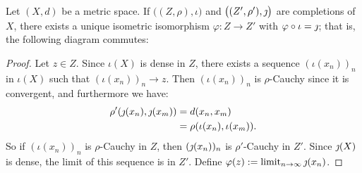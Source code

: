     \begin{theorem}\label{thm:unique-completion}
        Let $(X,d)$ be a metric space. If $\bigl((Z,\rho),\iota\bigr)$ and $\bigl((Z',\rho'),\jmath\bigr)$ are completions of $X$, there exists a unique isometric isomorphism $\varphi:Z \rightarrow Z'$ with $\varphi \circ \iota = \jmath$; that is, the following diagram commutes:
        \begin{center}
        \end{center}
            \begin{proof}
                Let $z \in Z$. Since $\iota(X)$ is dense in $Z$, there exists a sequence $(\iota(x_n))_n$ in $\iota(X)$ such that $(\iota(x_n))_n \rightarrow z$. Then $(\iota(x_n))_n$ is $\rho$-Cauchy since it is convergent, and furthermore we have:
                    \begin{equation*}
                    \begin{split}
                        \rho'(\jmath(x_n),\jmath(x_m))
                        & = d(x_n,x_m) \\
                        & = \rho(\iota(x_n),\iota(x_m)).
                    \end{split}
                    \end{equation*}
                So if $(\iota(x_n))_n$ is $\rho$-Cauchy in $Z$, then $(\jmath(x_n))_n$ is $\rho'$-Cauchy in $Z'$. Since $\jmath(X)$ is dense, the limit of this sequence is in $Z'$. Define $\varphi(z) := \operatorname*{limit}_{n \rightarrow \infty}\jmath(x_n)$.


\end{proof}
\end{theorem}
